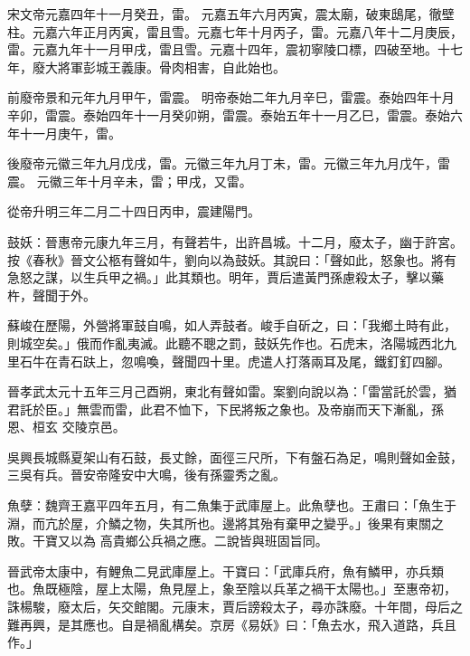 \begin{pinyinscope}
 宋文帝元嘉四年十一月癸丑，雷。
 元嘉五年六月丙寅，震太廟，破東鴟尾，徹壁柱。元嘉六年正月丙寅，雷且雪。元嘉七年十月丙子，雷。元嘉八年十二月庚辰，雷。元嘉九年十一月甲戌，雷且雪。元嘉十四年，震初寧陵口標，四破至地。十七年，廢大將軍彭城王義康。骨肉相害，自此始也。



 前廢帝景和元年九月甲午，雷震。
 明帝泰始二年九月辛巳，雷震。泰始四年十月辛卯，雷震。泰始四年十一月癸卯朔，雷震。泰始五年十一月乙巳，雷震。泰始六年十一月庚午，雷。



 後廢帝元徽三年九月戊戌，雷。元徽三年九月丁未，雷。元徽三年九月戊午，雷震。
 元徽三年十月辛未，雷；甲戌，又雷。



 從帝升明三年二月二十四日丙申，震建陽門。



 鼓妖：晉惠帝元康九年三月，有聲若牛，出許昌城。十二月，廢太子，幽于許宮。按《春秋》晉文公柩有聲如牛，劉向以為鼓妖。其說曰：「聲如此，怒象也。將有急怒之謀，以生兵甲之禍。」此其類也。明年，賈后遣黃門孫慮殺太子，擊以藥杵，聲聞于外。



 蘇峻在歷陽，外營將軍鼓自鳴，如人弄鼓者。峻手自斫之，曰：「我鄉土時有此，則城空矣。」俄而作亂夷滅。此聽不聰之罰，鼓妖先作也。石虎末，洛陽城西北九里石牛在青石趺上，忽鳴喚，聲聞四十里。虎遣人打落兩耳及尾，鐵釘釘四腳。



 晉孝武太元十五年三月己酉朔，東北有聲如雷。案劉向說以為：「雷當託於雲，猶君託於臣。」無雲而雷，此君不恤下，下民將叛之象也。及帝崩而天下漸亂，孫恩、桓玄
 交陵京邑。



 吳興長城縣夏架山有石鼓，長丈餘，面徑三尺所，下有盤石為足，鳴則聲如金鼓，三吳有兵。晉安帝隆安中大鳴，後有孫靈秀之亂。



 魚孽：魏齊王嘉平四年五月，有二魚集于武庫屋上。此魚孽也。王肅曰：「魚生于淵，而亢於屋，介鱗之物，失其所也。邊將其殆有棄甲之變乎。」後果有東關之敗。干寶又以為
 高貴鄉公兵禍之應。二說皆與班固旨同。



 晉武帝太康中，有鯉魚二見武庫屋上。干寶曰：「武庫兵府，魚有鱗甲，亦兵類也。魚既極陰，屋上太陽，魚見屋上，象至陰以兵革之禍干太陽也。」至惠帝初，誅楊駿，廢太后，矢交館閣。元康末，賈后謗殺太子，尋亦誅廢。十年間，母后之難再興，是其應也。自是禍亂構矣。京房《易妖》曰：「魚去水，飛入道路，兵且作。」




\end{pinyinscope}
